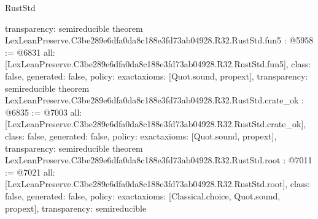 \begin{lexlean}{RustStd}
\begin{coremodule}
{  transparency: semireducible
}
theorem LexLeanPreserve.C3be289e6dfa0da8c188e3fd73ab04928.R32.RustStd.fun5 : @5958 := @6831 {
  all: [LexLeanPreserve.C3be289e6dfa0da8c188e3fd73ab04928.R32.RustStd.fun5],
  class: false,
  generated: false,
  policy: exact{axioms: [Quot.sound, propext]},
  transparency: semireducible
}
theorem LexLeanPreserve.C3be289e6dfa0da8c188e3fd73ab04928.R32.RustStd.crate_ok : @6835 := @7003 {
  all: [LexLeanPreserve.C3be289e6dfa0da8c188e3fd73ab04928.R32.RustStd.crate_ok],
  class: false,
  generated: false,
  policy: exact{axioms: [Quot.sound, propext]},
  transparency: semireducible
}
theorem LexLeanPreserve.C3be289e6dfa0da8c188e3fd73ab04928.R32.RustStd.root : @7011 := @7021 {
  all: [LexLeanPreserve.C3be289e6dfa0da8c188e3fd73ab04928.R32.RustStd.root],
  class: false,
  generated: false,
  policy: exact{axioms: [Classical.choice, Quot.sound, propext]},
  transparency: semireducible
}


\end{coremodule}
\end{lexlean}
